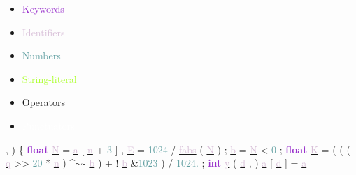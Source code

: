 \documentclass[usenames,dvipsnames]{beamer}
\begin{document}
\begin{frame}
\begin{multicols}{3} 
	 \begin{itemize} 
	 	 \item \textcolor{DarkOrchid}{Keywords} 
	 	 \item \textcolor{Thistle}{Identifiers} 
	 	 \item \textcolor{CadetBlue}{Numbers} 
	 	 \item \textcolor{GreenYellow}{String-literal} 
	 	 \item \textcolor{JungleGreen}{Operators} 
	 	 \item \textcolor{white}{Punctuators} 
	 \end{itemize} 
\end{multicols} 
\end{frame} 
 
\begin{frame} 
\textcolor{black}{ } \newline 
, 
) 
\{ 
\textbf{\textcolor{DarkOrchid}{float}} 
\underline{\textcolor{Thistle}{N}} 
\textcolor{JungleGreen}{=} 
\underline{\textcolor{Thistle}{a}} 
[ 
\underline{\textcolor{Thistle}{n}} 
\textcolor{JungleGreen}{+} 
\textcolor{CadetBlue}{3} 
] 
, 
\underline{\textcolor{Thistle}{E}} 
\textcolor{JungleGreen}{=} 
\textcolor{CadetBlue}{1024} 
\textcolor{JungleGreen}{/} 
\underline{\textcolor{Thistle}{fabs}} 
( 
\underline{\textcolor{Thistle}{N}} 
) 
; 
\underline{\textcolor{Thistle}{b}} 
\textcolor{JungleGreen}{=} 
\underline{\textcolor{Thistle}{N}} 
\textcolor{JungleGreen}{\textless} 
\textcolor{CadetBlue}{0} 
; 
\textbf{\textcolor{DarkOrchid}{float}} 
\underline{\textcolor{Thistle}{K}} 
\textcolor{JungleGreen}{=} 
\textcolor{black}{ } \newline 
\textcolor{black}{ } \newline 
( 
( 
( 
\underline{\textcolor{Thistle}{q}} 
\textcolor{JungleGreen}{\textgreater\textgreater} 
\textcolor{CadetBlue}{20} 
\textcolor{JungleGreen}{*} 
\underline{\textcolor{Thistle}{n}} 
) 
\textcolor{JungleGreen}{\textasciicircum}\textcolor{JungleGreen}{$\sim$}\textcolor{JungleGreen}{-} 
\underline{\textcolor{Thistle}{b}} 
) 
\textcolor{JungleGreen}{+} 
\textcolor{JungleGreen}{!} 
\underline{\textcolor{Thistle}{b}} 
\textcolor{JungleGreen}{\&}\textcolor{CadetBlue}{1023} 
) 
\textcolor{JungleGreen}{/} 
\textcolor{CadetBlue}{1024.} 
; 
\textbf{\textcolor{DarkOrchid}{int}} 
\underline{\textcolor{Thistle}{y}} 
( 
\underline{\textcolor{Thistle}{d}} 
, 
) 
\underline{\textcolor{Thistle}{a}} 
[ 
\underline{\textcolor{Thistle}{d}} 
] 
\textcolor{JungleGreen}{=} 
\underline{\textcolor{Thistle}{a}} 

\end{frame}
\end{document}
